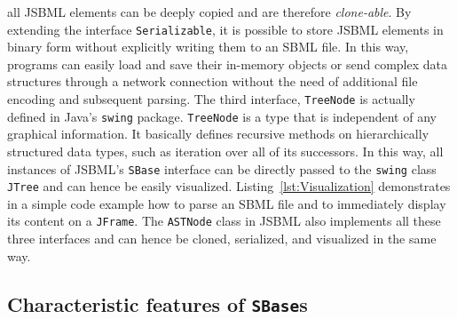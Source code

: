 %
all JSBML elements can be deeply copied and are therefore \emph{clone-able}. By
extending the interface \texttt{Serializable},
%
it is possible to store JSBML
%
elements in binary form without explicitly writing them to an SBML file.
%
In this way, programs can easily load and save their in-memory objects or send
complex data structures through a network connection without the need of
additional file encoding and subsequent parsing. The third interface,
\texttt{TreeNode} is actually defined in Java's \texttt{swing}
%
package.
\texttt{TreeNode} is a type that is independent of any graphical information. It
basically defines recursive methods on hierarchically structured data types,
such as iteration over all of its successors. In this way, all instances of
JSBML's
%
\texttt{SBase} interface can be directly passed to the \texttt{swing}
%
class \texttt{JTree}
%
and can hence be easily visualized. Listing~\vref{lst:Visualization}
demonstrates in a simple code example how to parse an SBML file
%
and to immediately display its content on a \texttt{JFrame}.
%
%
The \texttt{ASTNode} class in JSBML also
implements all these three interfaces and can hence be cloned, serialized, and
visualized in the same way.


\subsection{Characteristic features of \texttt{SBase}s}

